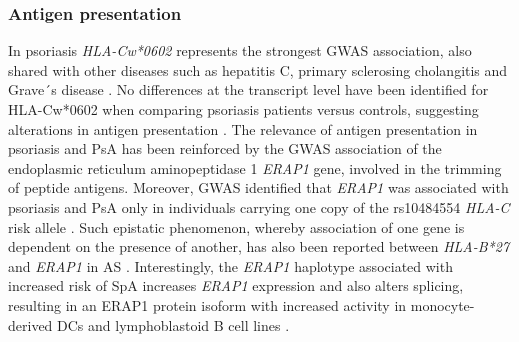 


\subsubsection*{Antigen presentation}
In psoriasis \textit{HLA-Cw*0602} represents the strongest GWAS association, also shared with other diseases such as hepatitis C, primary sclerosing cholangitis and Grave´s disease \parencite{Blais2011}. No differences at the transcript level have been identified for HLA-Cw*0602 when comparing psoriasis patients versus controls, suggesting alterations in antigen presentation  \parencite{Hundhausen2012}. The relevance of antigen presentation in psoriasis and PsA has been reinforced by the GWAS association of the endoplasmic reticulum aminopeptidase 1 \textit{ERAP1} gene, involved in the trimming of peptide antigens. Moreover, GWAS identified that \textit{ERAP1} was associated with psoriasis and PsA only in individuals carrying one copy of the rs10484554 \textit{HLA-C} risk allele \parencite{Strange2010}. %
Such epistatic phenomenon, whereby association of one gene is dependent on the presence of another, has also been reported between \textit{HLA-B*27} and \textit{ERAP1} in AS \parencite{Evans2011, Cortes2015}. Interestingly, the \textit{ERAP1} haplotype associated with increased risk of SpA increases \textit{ERAP1} expression and also alters splicing, resulting in an ERAP1 protein isoform with increased activity in monocyte-derived DCs and lymphoblastoid B cell lines \parencite{Costantino2015, Hanson2018}.%


